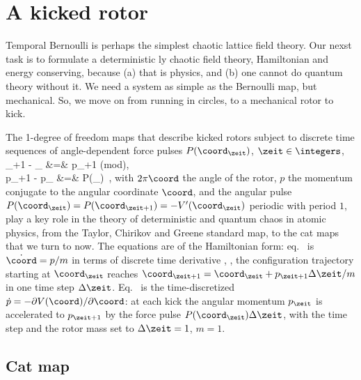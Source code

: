 
\section{A kicked rotor}
\label{s:kickRot}

Temporal Bernoulli is perhaps the simplest chaotic lattice field
theory. Our nexst task is to formulate a deterministic {\spt}ly chaotic
field theory, Hamiltonian and energy conserving, because (a) that is
physics, and (b) one cannot do quantum theory without it. We need a
system as simple as the Bernoulli map, but mechanical. So, we move on
from running in circles, to a mechanical rotor to kick.

The 1-degree of freedom maps that describe kicked rotors
subject to discrete time sequences of angle-dependent force pulses
$P(\coord_{\zeit})$, $\zeit\in\integers$,
\bea
\coord_{\zeit+1} - \coord_{\zeit} &=& p_{\zeit+1} \qquad  (\mbox{mod}),
    \label{LC21PerViv2.1b}\\
p_{\zeit+1} - p_{\zeit} &=& P(\coord_{\zeit})
\,,
    \label{LC21PerViv2.1a}
\eea
with $2\pi \coord$ the  angle of the rotor, $p$ the momentum conjugate to
the angular coordinate $\coord$, and the angular pulse
$P(\coord_{\zeit})=P(\coord_{\zeit+1})=-V'(\coord_{\zeit})$ periodic with
period $1$, play a key role in the theory of deterministic and quantum
chaos in  atomic physics, from the Taylor, Chirikov and Greene  standard
map, to the cat maps that we turn to now.
The equations are of the Hamiltonian form: eq.~ is
$\dot{\coord}=p/m$ in terms of discrete time derivative
, \ie, the configuration trajectory starting at
$\coord_{\zeit}$ reaches
$\coord_{\zeit+1}=\coord_{\zeit}+p_{\zeit+1}\Delta{\zeit}/m$ in one time
step $\Delta{\zeit}$. Eq.~ is the time-discretized
$\dot{p}=-\partial V(\coord)/\partial \coord$: at each kick the angular
momentum $p_{\zeit}$ is accelerated to $p_{\zeit+1}$ by the force pulse
$P(\coord_{\zeit})\Delta{\zeit}$, with the time step and the rotor mass
set to $\Delta{\zeit}=1$,  $m=1$.

\subsection{Cat map}
\label{s:catPV}

